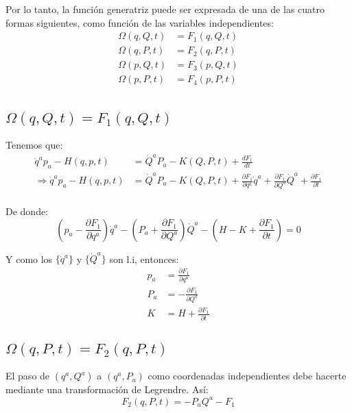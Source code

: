 \documentclass[paper=a4, fontsize=11pt,twoside]{scrartcl}
\begin{document}
Por lo tanto, la funci\'on generatriz puede ser expresada de una de las cuatro formas siguientes, como
funci\'on de las variables independientes:
	\begin{align*}
		\Omega(q,Q,t) &= F_{1}(q,Q,t) \\
		\Omega(q,P,t) &= F_{2}(q,P,t) \\
		\Omega(p,Q,t) &= F_{3}(p,Q,t) \\
		\Omega(p,P,t) &= F_{4}(p,P,t) \\
	\end{align*}

\subsection{$\Omega(q,Q,t) = F_{1}(q,Q,t)$}

Tenemos que:
	\begin{align}
		\dot{q}^{a}p_{a} - H(q,p,t) &=  \dot{Q}^{a}P_{a} - K(Q,P,t)  + \frac{dF_{1}}{dt} \\ \label{eqF1}
\Rightarrow \dot{q}^{a}p_{a} - H(q,p,t) &=  \dot{Q}^{a}P_{a} - K(Q,P,t)  + \frac{\partial F_{1}}{\partial q^{a}}\dot{q}^{a} 
										   +\frac{\partial F_{1}}{\partial Q^{a}}\dot{Q}^{a} + \frac{\partial F_{1}}{\partial t}\\
	\end{align}

De donde:
	\begin{equation*}
		\left(p_{a} - \frac{\partial F_{1}}{\partial q^{a}} \right)\dot{q}^{a}
	   -\left( P_{a} +\frac{\partial F_{1}}{\partial Q^{a}} \right)\dot{Q}^{a}
	   - \left(H - K + \frac{\partial F_{1}}{\partial t}\right)  = 0
	\end{equation*}
	
Y como los $\{ \dot{q}^{a} \}$ y $\{ \dot{Q}^{a} \}$ son l.i, entonces:
	\begin{align*}
		p_{a} &= \frac{\partial F_{1}}{\partial q^{a}}\\
		P_{a} &= -\frac{\partial F_{1}}{\partial Q^{a}} \\
		K &= H + \frac{\partial F_{1}}{\partial t}
	\end{align*}

\subsection{$\Omega(q,P,t) = F_{2}(q,P,t)$}

El paso de $(q^{a},Q^{a})$  a $(q^{a},P_{a})$ como coordenadas independientes debe hacerte mediante una transformaci\'on de Legrendre.
As\'i:
	\begin{equation*}
		F_{2}(q,P,t) = -P_{a}Q^{a} - F_{1}
	\end{equation*}
\end{document}
